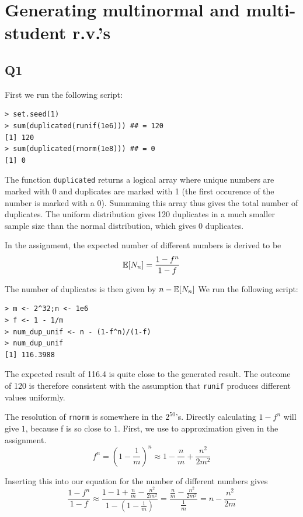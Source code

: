 \section*{Generating multinormal and multi-student r.v.'s}

\subsection*{Q1}

First we run the following script:

\begin{verbatim}
> set.seed(1)
> sum(duplicated(runif(1e6))) ## = 120
[1] 120
> sum(duplicated(rnorm(1e8))) ## = 0
[1] 0
\end{verbatim}

The function \verb|duplicated| returns a logical array where unique numbers are marked with 0 and duplicates are marked with 1 (the first occurence of the number is marked with a 0). Summming this array thus gives the total number of duplicates. The uniform distribution gives 120 duplicates in a much smaller sample size than the normal distribution, which gives 0 duplicates.

In the assignment, the expected number of different numbers is derived to be 
\begin{displaymath}
  \operatorname{\mathbb{E}}[N_n] = \frac{1 - f^n}{1-f}
\end{displaymath}

The number of duplicates is then given by 
$n - \operatorname{\mathbb{E}}[N_n]$
We run the following script:

\begin{verbatim}
> m <- 2^32;n <- 1e6
> f <- 1 - 1/m
> num_dup_unif <- n - (1-f^n)/(1-f)
> num_dup_unif
[1] 116.3988
\end{verbatim}

The expected result of 116.4 is quite close to the generated result. The outcome of 120 is therefore consistent with the assumption that \verb|runif| produces different values uniformly.

The resolution of \verb|rnorm| is somewhere in the $2^{50}$'s. Directly calculating $1 - f^n$ will give $1$, because f is so close to $1$.
First, we use to approximation given in the assignment.
\begin{displaymath}
f^n = \left( 1 - \frac{1}{m}\right)^n \approx 1 - \frac{n}{m} + \frac{n^2}{2m^2}
\end{displaymath}

Inserting this into our equation for the number of different numbers gives
\begin{displaymath}
\frac{1 - f^n}{1-f} \approx \frac{1 - 1 + \frac{n}{m} - \frac{n^2}{2m^2}}{1- \left(1 - \frac{1}{m}\right)}  = \frac{\frac{n}{m} - \frac{n^2}{2m^2}}{\frac{1}{m}} = n - \frac{n^2}{2m}
\end{displaymath}

